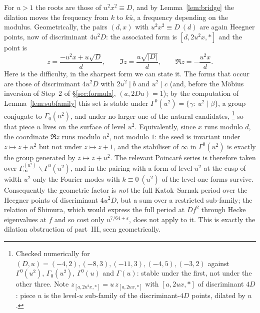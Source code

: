 \documentclass[11pt,a4paper]{article}
\theoremstyle{remark}\newtheorem{remark}[theorem]{Remark}
\begin{document}
For $u>1$ the roots are those of $u^2x^2\equiv D$, and by Lemma~\ref{lem:bridge} the dilation moves the frequency
from $k$ to $k\bar u$, a frequency depending on the modulus. Geometrically, the pairs $(d,x)$ with
$u^2x^2\equiv D\ (d)$ are again Heegner points, now of discriminant $4u^2D$: the associated form is
$[d,2u^2x,\ast]$ and the point is
\[
z=\frac{-u^2x+u\sqrt D}{d},\qquad \Im z=\frac{u\sqrt{|D|}}d,\qquad \Re z=-\frac{u^2x}d .
\]
Here is the difficulty, in the sharpest form we can state it. The forms that occur are those of discriminant
$4u^2D$ with $2u^2\mid b$ and $u^2\mid c$ (and, before the M\"obius inversion of Step~2 of \S\ref{sec:formula},
$(a,2Du)=1$); by the computation of Lemma~\ref{lem:subfamily} this set is stable under
$\Gamma^0(u^2)=\{\gamma:\ u^2\mid\beta\}$, a group conjugate to $\Gamma_0(u^2)$, and under no larger one of the
natural candidates, \footnote{Checked numerically for $(D,u)=(-4,2),(-8,3),(-11,3),(-4,5),(-3,2)$ against
$\Gamma^0(u^2)$, $\Gamma_0(u^2)$, $\Gamma^0(u)$ and $\Gamma(u)$: stable under the first, not under the other three. Note
$z_{[a,2u^2x,\ast]}=u\,z_{[a,2ux,\ast]}$ with $[a,2ux,\ast]$ of discriminant $4D$: piece $u$ is the level-$u$
sub-family of the discriminant-$4D$ points, dilated by $u$.} so that piece $u$ lives on the surface of level $u^2$.
Equivalently, since $x$ runs modulo $d$, the coordinate $\Re z$ runs modulo $u^2$, not modulo $1$: the seed is
invariant under $z\mapsto z+u^2$ but not under $z\mapsto z+1$, and the stabiliser of $\infty$ in $\Gamma^0(u^2)$ is
exactly the group generated by $z\mapsto z+u^2$. The relevant Poincar\'e series is therefore taken over
$\Gamma_\infty^{(u^2)}\backslash\Gamma^0(u^2)$, and in the pairing with a form of level $u^2$ at the cusp of width $u^2$ only the Fourier modes with $k\equiv0\ (u^2)$
of the level-one forms survive.
Consequently the geometric factor is \emph{not} the full Katok--Sarnak period over the Heegner points of
discriminant $4u^2D$, but a sum over a restricted sub-family; the relation of Shimura, which would express the full
period at $Df^2$ through Hecke eigenvalues at $f$ and so cost only $u^{7/64+\varepsilon}$, does not apply to it. This is
exactly the dilation obstruction of part~III, seen geometrically.
\end{document}

